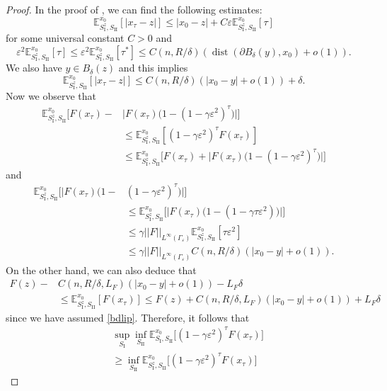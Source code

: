 \documentclass[english]{amsart}
\newcommand{\dist}{\operatorname{dist}}
\newcommand{\eps}{\varepsilon}
\theoremstyle{plain}
\theoremstyle{definition}
\theoremstyle{remark}
\numberwithin{equation}{section}
\begin{document}
\begin{proof}
In the proof of \cite[Lemma 4.6]{MR3011990}, we can find the following estimates: 
$$\mathbb{E}_{S_{\textrm{I}}^{z},S_{\textrm{II}}}^{x_0}[|x_{\tau}-z|]\le  |x_0-z|+C\eps \mathbb{E}_{S_{\textrm{I}}^{z},S_{\textrm{II}}}^{x_0}[\tau]$$
for some universal constant $C>0$ and 
$$\eps^2 \mathbb{E}_{S_{\textrm{I}}^{z},S_{\textrm{II}}}^{x_0}[\tau]\le \eps^2\mathbb{E}_{S_{\textrm{I}}^{z},S_{\textrm{II}}}^{x_0}[\tau^{\ast}]
\le C(n,  R/\delta)( \dist(\partial B_{\delta}(y),x_{0})+o(1)). $$
We also have $y \in B_{\delta}(z)$ and this implies
$$ \mathbb{E}_{S_{\textrm{I}}^{z},S_{\textrm{II}}}^{x_0}[|x_{\tau}-z|]\le C(n,  R/\delta)( |x_0-y|+o(1)) +\delta.$$
Now we observe that
\begin{align*}
\mathbb{E}_{S_{\textrm{I}}^{z},S_{\textrm{II}}}^{x_0}\big[F(x_{\tau})-&\big|F(x_{\tau})\big(1-(1-\gamma \eps^2)^{\tau}\big)\big|\big]
\\&\le
\mathbb{E}_{S_{\textrm{I}}^{z},S_{\textrm{II}}}^{x_0}[(1-\gamma \eps^2)^{\tau}F(x_{\tau})]
\\& \le \mathbb{E}_{S_{\textrm{I}}^{z},S_{\textrm{II}}}^{x_0}\big[F(x_{\tau})+\big|F(x_{\tau})\big(1-(1-\gamma \eps^2)^{\tau}\big)\big|\big]
\end{align*}
and
\begin{align*}
 \mathbb{E}_{S_{\textrm{I}}^{z},S_{\textrm{II}}}^{x_0}\big[\big|F(x_{\tau})\big(1-&(1-\gamma \eps^2)^{\tau}\big)\big|\big]
 \\ & \le  \mathbb{E}_{S_{\textrm{I}}^{z},S_{\textrm{II}}}^{x_0}\big[\big|F(x_{\tau})\big(1-(1-\gamma \tau \eps^2)\big)\big|\big]
 \\&\le  \gamma||F||_{L^{\infty}(\Gamma_{\eps})} \mathbb{E}_{S_{\textrm{I}}^{z},S_{\textrm{II}}}^{x_0}[\tau \eps^2]
 \\&\le  \gamma||F||_{L^{\infty}(\Gamma_{\eps})}C(n,  R/\delta)(  |x_0-y|+o(1)).
\end{align*}
On the other hand, we can also deduce that
\begin{align*}
F(z)-&C(n,  R/\delta, L_F)( |x_0-y|+o(1)) -L_F\delta
\\& \le \mathbb{E}_{S_{\textrm{I}}^{z},S_{\textrm{II}}}^{x_0}[F(x_{\tau})] \le 
F(z)+C(n,  R/\delta, L_F)( |x_0-y|+o(1)) +L_F\delta
\end{align*}
since we have assumed \eqref{bdlip}.
Therefore, it follows that
\begin{align*}
&\sup_{S_{\textrm{I}}}\inf_{S_{\textrm{II}}}\mathbb{E}_{S_{\textrm{I}},S_{\textrm{II}}}^{x_0}\big[(1-\gamma \eps^2)^{\tau}F(x_{\tau})\big]
\\&\ge \inf_{S_{\textrm{II}}}\mathbb{E}_{S_{\textrm{I}}^{z},S_{\textrm{II}}}^{x_0}\big[(1-\gamma \eps^2)^{\tau}F(x_{\tau})\big]

\end{align*}
\end{proof}
\end{document}
